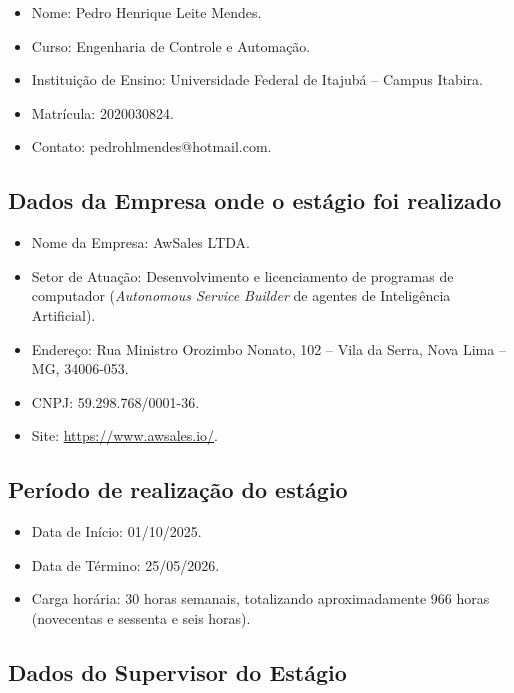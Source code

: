 \documentclass[12pt,a4paper,oneside]{article}
\begin{document}
\begin{itemize}[leftmargin=2em,topsep=0pt]
  \item Nome: Pedro Henrique Leite Mendes.
  \item Curso: Engenharia de Controle e Automação.
  \item Instituição de Ensino: Universidade Federal de Itajubá -- Campus Itabira.
  \item Matrícula: 2020030824.
  \item Contato: pedrohlmendes@hotmail.com.
\end{itemize}

\subsection{Dados da Empresa onde o estágio foi realizado}

\begin{itemize}[leftmargin=2em,topsep=0pt]
  \item Nome da Empresa: AwSales LTDA.
  \item Setor de Atuação: Desenvolvimento e licenciamento de programas de computador (\textit{Autonomous Service Builder} de agentes de Inteligência Artificial).
  \item Endereço: Rua Ministro Orozimbo Nonato, 102 -- Vila da Serra, Nova Lima -- MG, 34006-053.
  \item CNPJ: 59.298.768/0001-36.
  \item Site: \url{https://www.awsales.io/}.
\end{itemize}

\subsection{Período de realização do estágio}

\begin{itemize}[leftmargin=2em,topsep=0pt]
  \item Data de Início: 01/10/2025.
  \item Data de Término: 25/05/2026.
  \item Carga horária: 30 horas semanais, totalizando aproximadamente 966 horas (novecentas e sessenta e seis horas).
\end{itemize}

\subsection{Dados do Supervisor do Estágio}
\end{document}
